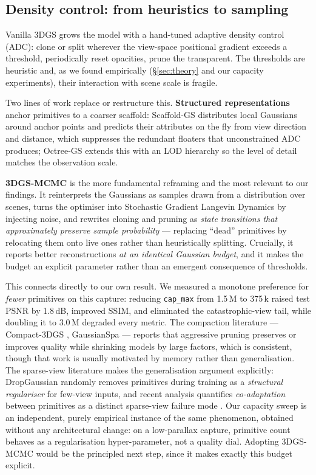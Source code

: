 \subsection{Density control: from heuristics to sampling}
\label{sec:rw-density}

Vanilla 3DGS grows the model with a hand-tuned adaptive density control (ADC):
clone or split wherever the view-space positional gradient exceeds a threshold,
periodically reset opacities, prune the transparent. The thresholds are heuristic
and, as we found empirically (\S\ref{sec:theory} and our capacity experiments),
their interaction with scene scale is fragile.

Two lines of work replace or restructure this. \textbf{Structured
representations} anchor primitives to a coarser scaffold: Scaffold-GS
\cite{lu2024scaffoldgs} distributes local Gaussians around anchor points and
predicts their attributes on the fly from view direction and distance, which
suppresses the redundant floaters that unconstrained ADC produces; Octree-GS
\cite{ren2024octreegs} extends this with an LOD hierarchy so the level of detail
matches the observation scale.

\textbf{3DGS-MCMC} \cite{kheradmand2024mcmc} is the more fundamental reframing and
the most relevant to our findings. It reinterprets the Gaussians as samples drawn
from a distribution over scenes, turns the optimiser into Stochastic Gradient
Langevin Dynamics by injecting noise, and rewrites cloning and pruning as
\emph{state transitions that approximately preserve sample probability} — replacing
``dead'' primitives by relocating them onto live ones rather than heuristically
splitting. Crucially, it reports better reconstructions \emph{at an identical
Gaussian budget}, and it makes the budget an explicit parameter rather than an
emergent consequence of thresholds.

This connects directly to our own result. We measured a monotone preference for
\emph{fewer} primitives on this capture: reducing \texttt{cap\_max} from 1.5\,M to
375\,k raised test PSNR by 1.8\,dB, improved SSIM, and eliminated the
catastrophic-view tail, while doubling it to 3.0\,M degraded every metric. The
compaction literature — Compact-3DGS \cite{lee2024compact3dgs}, GaussianSpa
\cite{zhang2024gaussianspa} — reports that aggressive pruning preserves or improves
quality while shrinking models by large factors, which is consistent, though that
work is usually motivated by memory rather than generalisation. The sparse-view
literature makes the generalisation argument explicitly: DropGaussian
\cite{park2025dropgaussian} randomly removes primitives during training as a
\emph{structural regulariser} for few-view inputs, and recent analysis quantifies
\emph{co-adaptation} between primitives as a distinct sparse-view failure mode
\cite{coadaptation2025}. Our capacity sweep is an independent, purely empirical
instance of the same phenomenon, obtained without any architectural change: on a
low-parallax capture, primitive count behaves as a regularisation hyper-parameter,
not a quality dial. Adopting 3DGS-MCMC would be the principled next step, since it
makes exactly this budget explicit.

